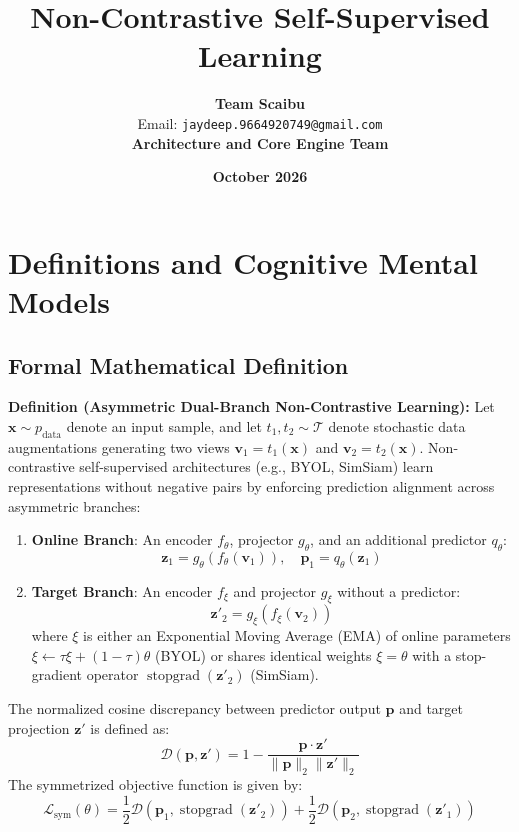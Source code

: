 \documentclass[11pt,a4paper]{article}
\title{\textbf{Non-Contrastive Self-Supervised Learning}}
\author{\textbf{Team Scaibu} \\ \small Email: \texttt{jaydeep.9664920749@gmail.com} \\ \small \textbf{Architecture and Core Engine Team}}
\date{\textbf{October 2026}}
\theoremstyle{definition}
\begin{document}
\maketitle

\section{Definitions and Cognitive Mental Models}

\subsection{Formal Mathematical Definition}
\textbf{Definition (Asymmetric Dual-Branch Non-Contrastive Learning):}
Let $\mathbf{x} \sim p_{\text{data}}$ denote an input sample, and let $t_1, t_2 \sim \mathcal{T}$ denote stochastic data augmentations generating two views $\mathbf{v}_1 = t_1(\mathbf{x})$ and $\mathbf{v}_2 = t_2(\mathbf{x})$. Non-contrastive self-supervised architectures (e.g., BYOL, SimSiam) learn representations without negative pairs by enforcing prediction alignment across asymmetric branches:
\begin{enumerate}
    \item \textbf{Online Branch}: An encoder $f_\theta$, projector $g_\theta$, and an additional predictor $q_\theta$:
    {\boldmath
    \begin{equation}
    \mathbf{z}_1 = g_\theta(f_\theta(\mathbf{v}_1)), \quad \mathbf{p}_1 = q_\theta(\mathbf{z}_1)
    \end{equation}
    }
    \item \textbf{Target Branch}: An encoder $f_\xi$ and projector $g_\xi$ without a predictor:
    {\boldmath
    \begin{equation}
    \mathbf{z}'_2 = g_\xi(f_\xi(\mathbf{v}_2))
    \end{equation}
    }
    where $\xi$ is either an Exponential Moving Average (EMA) of online parameters $\xi \gets \tau \xi + (1 - \tau)\theta$ (BYOL) or shares identical weights $\xi = \theta$ with a stop-gradient operator $\operatorname{stopgrad}(\mathbf{z}'_2)$ (SimSiam).
\end{enumerate}
The normalized cosine discrepancy between predictor output $\mathbf{p}$ and target projection $\mathbf{z}'$ is defined as:
{\boldmath
\begin{equation}
\mathcal{D}(\mathbf{p}, \mathbf{z}') = 1 - \frac{\mathbf{p} \cdot \mathbf{z}'}{\|\mathbf{p}\|_2 \|\mathbf{z}'\|_2}
\end{equation}
}
The symmetrized objective function is given by:
{\boldmath
\begin{equation}
\mathcal{L}_{\text{sym}}(\theta) = \frac{1}{2} \mathcal{D}(\mathbf{p}_1, \operatorname{stopgrad}(\mathbf{z}'_2)) + \frac{1}{2} \mathcal{D}(\mathbf{p}_2, \operatorname{stopgrad}(\mathbf{z}'_1))
\end{equation}
}
\end{document}
